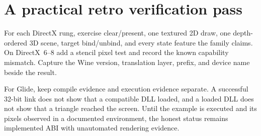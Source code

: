 \section{A practical retro verification pass}

For each DirectX rung, exercise clear/present, one textured 2D draw, one depth-ordered 3D
scene, target bind/unbind, and every state feature the family claims.  On DirectX~6--8 add a
stencil pixel test and record the known capability mismatch.  Capture the Wine version,
translation layer, prefix, and device name beside the result.

For Glide, keep compile evidence and execution evidence separate.  A successful 32-bit link
does not show that a compatible DLL loaded, and a loaded DLL does not show that a triangle
reached the screen.  Until the example is executed and its pixels observed in a documented
environment, the honest status remains implemented ABI with unautomated rendering evidence.
